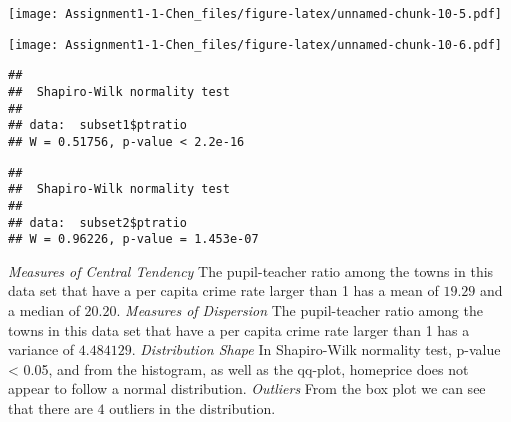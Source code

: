 \documentclass[
  12pt,
]{article}
\newenvironment{Shaded}{\begin{snugshade}}{\end{snugshade}}
\newcommand{\AttributeTok}[1]{\textcolor[rgb]{0.77,0.63,0.00}{#1}}
\newcommand{\DecValTok}[1]{\textcolor[rgb]{0.00,0.00,0.81}{#1}}
\newcommand{\FunctionTok}[1]{\textcolor[rgb]{0.00,0.00,0.00}{#1}}
\newcommand{\NormalTok}[1]{#1}
\newcommand{\SpecialCharTok}[1]{\textcolor[rgb]{0.00,0.00,0.00}{#1}}
\newcommand{\StringTok}[1]{\textcolor[rgb]{0.31,0.60,0.02}{#1}}
\begin{document}
\texttt{[image: Assignment1-1-Chen\_files/figure-latex/unnamed-chunk-10-5.pdf]}

\begin{Shaded}
\end{Shaded}

\texttt{[image: Assignment1-1-Chen\_files/figure-latex/unnamed-chunk-10-6.pdf]}

\begin{Shaded}
\end{Shaded}

\begin{verbatim}
## 
##  Shapiro-Wilk normality test
## 
## data:  subset1$ptratio
## W = 0.51756, p-value < 2.2e-16
\end{verbatim}

\begin{Shaded}
\end{Shaded}

\begin{verbatim}
## 
##  Shapiro-Wilk normality test
## 
## data:  subset2$ptratio
## W = 0.96226, p-value = 1.453e-07
\end{verbatim}

\emph{Measures of Central Tendency} The pupil-teacher ratio among the
towns in this data set that have a per capita crime rate larger than 1
has a mean of \(19.29\) and a median of \(20.20\). \emph{Measures of
Dispersion} The pupil-teacher ratio among the towns in this data set
that have a per capita crime rate larger than 1 has a variance of
\(4.484129\). \emph{Distribution Shape} In Shapiro-Wilk normality test,
p-value \textless{} 0.05, and from the histogram, as well as the
qq-plot, homeprice does not appear to follow a normal distribution.
\emph{Outliers} From the box plot we can see that there are \(4\)
outliers in the distribution.
\end{document}
